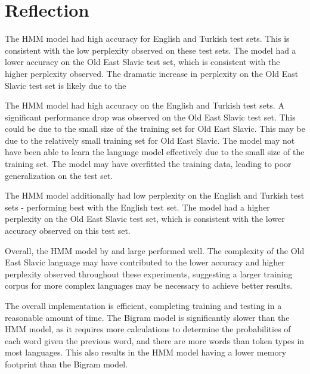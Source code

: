 \documentclass[a4paper, 12pt]{article}
\begin{document}
\pagebreak
\section{Reflection}

The HMM model had high accuracy for English and Turkish test sets. This is consistent with the low perplexity observed on these test sets. The model had a lower accuracy on the Old East Slavic test set, which is consistent with the higher perplexity observed. The dramatic increase in perplexity on the Old East Slavic test set is likely due to the 

The HMM model had high accuracy on the English and Turkish test sets. A significant performance drop was observed on the Old East Slavic test set. This could be due to the small size of the training set for Old East Slavic. This may be due to the relatively small training set for Old East Slavic. The model may not have been able to learn the language model effectively due to the small size of the training set. The model may have overfitted the training data, leading to poor generalization on the test set.

The HMM model additionally had low perplexity on the English and Turkish test sets - performing best with the English test set. The model had a higher perplexity on the Old East Slavic test set, which is consistent with the lower accuracy observed on this test set.

Overall, the HMM model by and large performed well. The complexity of the Old East Slavic language may have contributed to the lower accuracy and higher perplexity observed throughout these experiments, suggesting a larger training corpus for more complex languages may be necessary to achieve better results.


The overall implementation is efficient, completing training and testing in a reasonable amount of time. The Bigram model is significantly slower than the HMM model, as it requires more calculations to determine the probabilities of each word given the previous word, and there are more words than token types in most languages. This also results in the HMM model having a lower memory footprint than the Bigram model.
\end{document}

